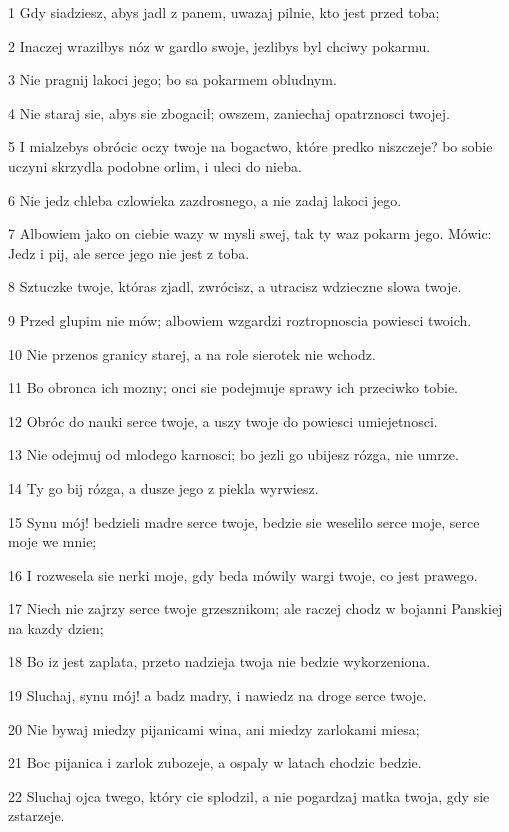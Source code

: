 \par 1 Gdy siadziesz, abys jadl z panem, uwazaj pilnie, kto jest przed toba;
\par 2 Inaczej wrazilbys nóz w gardlo swoje, jezlibys byl chciwy pokarmu.
\par 3 Nie pragnij lakoci jego; bo sa pokarmem obludnym.
\par 4 Nie staraj sie, abys sie zbogacil; owszem, zaniechaj opatrznosci twojej.
\par 5 I mialzebys obrócic oczy twoje na bogactwo, które predko niszczeje? bo sobie uczyni skrzydla podobne orlim, i uleci do nieba.
\par 6 Nie jedz chleba czlowieka zazdrosnego, a nie zadaj lakoci jego.
\par 7 Albowiem jako on ciebie wazy w mysli swej, tak ty waz pokarm jego. Mówic: Jedz i pij, ale serce jego nie jest z toba.
\par 8 Sztuczke twoje, któras zjadl, zwrócisz, a utracisz wdzieczne slowa twoje.
\par 9 Przed glupim nie mów; albowiem wzgardzi roztropnoscia powiesci twoich.
\par 10 Nie przenos granicy starej, a na role sierotek nie wchodz.
\par 11 Bo obronca ich mozny; onci sie podejmuje sprawy ich przeciwko tobie.
\par 12 Obróc do nauki serce twoje, a uszy twoje do powiesci umiejetnosci.
\par 13 Nie odejmuj od mlodego karnosci; bo jezli go ubijesz rózga, nie umrze.
\par 14 Ty go bij rózga, a dusze jego z piekla wyrwiesz.
\par 15 Synu mój! bedzieli madre serce twoje, bedzie sie weselilo serce moje, serce moje we mnie;
\par 16 I rozwesela sie nerki moje, gdy beda mówily wargi twoje, co jest prawego.
\par 17 Niech nie zajrzy serce twoje grzesznikom; ale raczej chodz w bojanni Panskiej na kazdy dzien;
\par 18 Bo iz jest zaplata, przeto nadzieja twoja nie bedzie wykorzeniona.
\par 19 Sluchaj, synu mój! a badz madry, i nawiedz na droge serce twoje.
\par 20 Nie bywaj miedzy pijanicami wina, ani miedzy zarlokami miesa;
\par 21 Boc pijanica i zarlok zubozeje, a ospaly w latach chodzic bedzie.
\par 22 Sluchaj ojca twego, który cie splodzil, a nie pogardzaj matka twoja, gdy sie zstarzeje.
